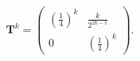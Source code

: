 \begin{align} \mathbf{T}^k = \begin{pmatrix} (\frac{1}{4})^k & \frac{k}{2^{2k - 1}} \\[4pt] 0 & (\frac{1}{4})^k \end{pmatrix}. \end{align}
